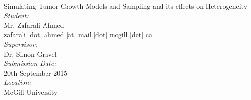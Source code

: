 \documentclass[12pt]{article}
\begin{document}
\begin{titlepage}
	\begin{center}
		~\\[2.0cm]
		{\Huge Simulating Tumor Growth Models and Sampling and its effects on Heterogeneity}\\[1.5cm]
		\emph{Student:}\\
		Mr. Zafarali Ahmed\\
		{\scriptsize zafarali [dot] ahmed [at] mail [dot] mcgill [dot] ca} \\[1.0cm]
		\emph{Supervisor:}\\
		Dr. Simon Gravel\\[1.0cm]
		\emph{Submission Date:}\\
		20th September 2015\\[1.0cm]
		\emph{Location:}\\
		McGill University
	\end{center}
\end{titlepage}
\end{document}
